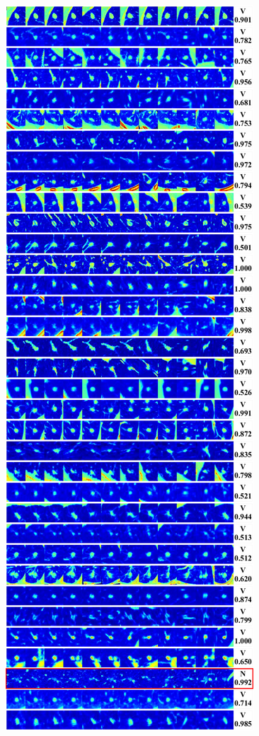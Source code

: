 \documentclass[onecolumn]{IEEEtran}
\begin{document}
\begin{figure}[H]
{\includegraphics[width=0.45\columnwidth]{./images/lidc-colornodules-vessel3}
}
\end{figure}
\newpage
\end{document}
